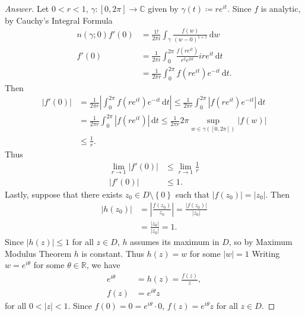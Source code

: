 \documentclass[12pt]{article}
\newcommand{\cx}{\mathbb{C}}
\newcommand{\real}{\mathbb{R}}
\newcommand\paren[1]{\left( #1 \right)}
\newcommand\setb[1]{\left \{ #1 \right \}}
\newcommand{\abs}[1]{\left| #1 \right|}
\theoremstyle{definition}
\begin{document}
\begin{proof}[Answer]
    Let $0 < r < 1$, $\gamma : [0,2\pi] \to \cx$ given by $\gamma(t) \coloneqq re^{it}$. Since $f$ is analytic, by Cauchy's Integral Formula
    \begin{align*}
        n(\gamma;0)f'(0) & = \frac{1!}{2\pi i} \int_{\gamma} \frac{f(w)}{(w-0)^{1+1}} \, \mathrm{d}w \\
        f'(0) & = \frac{1}{2\pi i} \int_0^{2\pi} \frac{ f \paren{ re^{it} } }{ r^2 e^{2it} } ire^{it} \, \mathrm{d}t \\
        & = \frac{1}{2\pi r} \int_0^{2\pi} f \paren{ re^{it} } e^{-it} \, \mathrm{d}t.
    \end{align*}
    Then 
    \begin{align*}
        \abs{ f'(0) } & = \frac{1}{2\pi r} \abs{ \int_0^{2\pi} f \paren{ re^{it} }  e^{-it} \, \mathrm{d}t } \leq \frac{1}{2\pi r} \int_0^{2\pi} \abs{ f \paren{ re^{it} }  e^{-it} } \, \mathrm{d}t \\
        & = \frac{1}{2\pi r}\int_0^{2\pi} \abs{ f \paren{ re^{it} } } \, \mathrm{d}t \leq \frac{1}{2\pi r} 2\pi \sup\limits_{w \in \gamma \paren{ [0,2\pi] }} \abs{ f(w) } \\
        & \leq \frac{1}{r}.
    \end{align*}
    Thus
    \begin{align*}
        \lim\limits_{r \to 1} \abs{ f'(0) } & \leq \lim\limits_{r \to 1} \frac{1}{r} \\
        \abs{ f'(0) } & \leq 1.
    \end{align*}
    Lastly, suppose that there exists $z_0 \in D \setminus \setb{ 0 }$ such that $\abs{ f \paren{ z_0 } } = \abs{ z_0 }$. Then
    \begin{align*}
        \abs{ h \paren{ z_0 } } & = \abs{ \frac{f \paren{ z_0 } }{z_0} } = \frac{\abs{ f \paren{ z_0 } }}{\abs{ z_0 }} \\
        & = \frac{\abs{ z_0 }}{\abs{ z_0 }} = 1.
    \end{align*}
    Since $\abs{ h(z) } \leq 1$ for all $z \in D$, $h$ assumes its maximum in $D$, so by Maximum Modulus Theorem $h$ is constant. Thus $h(z) = w$ for some $|w| = 1$ Writing $w = e^{i\theta}$ for some $\theta \in \real$, we have
    \begin{align*}
        e^{i\theta} & = h(z) = \frac{f(z)}{z} , \\
        f(z) & = e^{i\theta} z
    \end{align*}
    for all $0 < |z| < 1$. Since $f(0) = 0 = e^{i\theta} \cdot 0$, $f(z) = e^{i\theta} z$ for all $z \in D$.
\end{proof}
\end{document}
